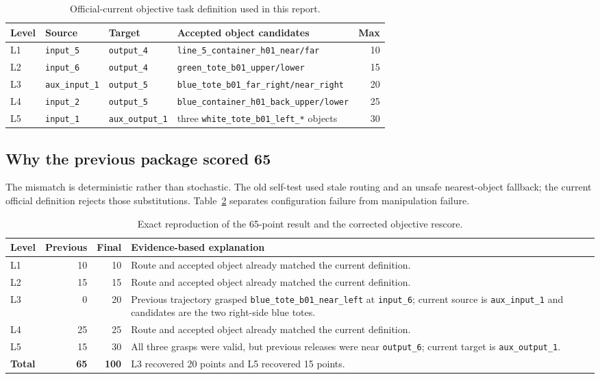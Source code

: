 \documentclass[11pt,a4paper]{article}
\begin{document}
\begin{table}[H]
\centering
\small
\begin{tabularx}{\textwidth}{l l l X r}
\toprule
\textbf{Level} & \textbf{Source} & \textbf{Target} & \textbf{Accepted object candidates} & \textbf{Max} \\
\midrule
L1 & \texttt{input\_5} & \texttt{output\_4} & \texttt{line\_5\_container\_h01\_near/far} & 10 \\
L2 & \texttt{input\_6} & \texttt{output\_4} & \texttt{green\_tote\_b01\_upper/lower} & 15 \\
L3 & \texttt{aux\_input\_1} & \texttt{output\_5} & \texttt{blue\_tote\_b01\_far\_right/near\_right} & 20 \\
L4 & \texttt{input\_2} & \texttt{output\_5} & \texttt{blue\_container\_h01\_back\_upper/lower} & 25 \\
L5 & \texttt{input\_1} & \texttt{aux\_output\_1} & three \texttt{white\_tote\_b01\_left\_*} objects & 30 \\
\bottomrule
\end{tabularx}
\caption{Official-current objective task definition used in this report.}
\label{tab:tasks}
\end{table}

\subsection{Why the previous package scored 65}

The mismatch is deterministic rather than stochastic. The old self-test used stale routing and an unsafe nearest-object fallback; the current official definition rejects those substitutions. Table~\ref{tab:rootcause} separates configuration failure from manipulation failure.

\begin{table}[H]
\centering
\small
\begin{tabularx}{\textwidth}{l r r X}
\toprule
\textbf{Level} & \textbf{Previous} & \textbf{Final} & \textbf{Evidence-based explanation} \\
\midrule
L1 & 10 & 10 & Route and accepted object already matched the current definition. \\
L2 & 15 & 15 & Route and accepted object already matched the current definition. \\
L3 & 0 & 20 & Previous trajectory grasped \texttt{blue\_tote\_b01\_near\_left} at \texttt{input\_6}; current source is \texttt{aux\_input\_1} and candidates are the two right-side blue totes. \\
L4 & 25 & 25 & Route and accepted object already matched the current definition. \\
L5 & 15 & 30 & All three grasps were valid, but previous releases were near \texttt{output\_6}; current target is \texttt{aux\_output\_1}. \\
\midrule
\textbf{Total} & \textbf{65} & \textbf{100} & L3 recovered 20 points and L5 recovered 15 points. \\
\bottomrule
\end{tabularx}
\caption{Exact reproduction of the 65-point result and the corrected objective rescore.}
\label{tab:rootcause}
\end{table}
\end{document}
